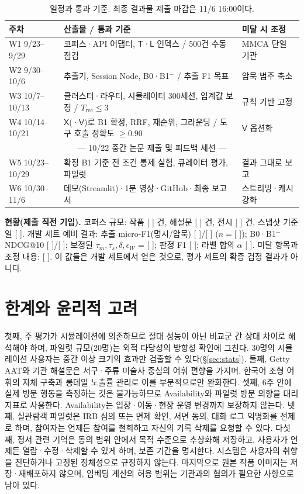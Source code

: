 \documentclass[10pt,twocolumn,letterpaper]{article}
\newcommand{\fillin}[1]{\textcolor{fillc}{[#1]}}
\newcommand{\sT}{\mathsf{T}}
\newcommand{\sX}{\mathsf{X}}
\newcommand{\sV}{\mathsf{V}}
\newcommand{\sL}{\mathsf{L}}
\begin{document}
\begin{table}[t]
\centering\small
\setlength{\tabcolsep}{3pt}
\begin{tabularx}{\columnwidth}{@{}l>{\raggedright\arraybackslash}X>{\raggedright\arraybackslash}p{1.65cm}@{}}
\toprule
주차 & 산출물 / 통과 기준 & 미달 시 조정 \\
\midrule
W1 9/23–9/29 & 코퍼스·API 어댑터, $\sT$·$\sL$ 인덱스 / 500건 수동 점검 & MMCA 단일 기관 \\
W2 9/30–10/6 & 추출기, Session Node, B0·B1$^-$ / 추출 F1 목표 & 암묵 범주 축소 \\
W3 10/7–10/13 & 클러스터·라우터, 시뮬레이터 300세션, 임계값 보정 / $T_{\mathrm{rec}}\le3$ & 규칙 기반 고정 \\
W4 10/14–10/21 & $\sX$(·$\sV$)로 B1 확정, RRF, 재순위, 그라운딩 / 도구 호출 정확도 $\ge0.90$ & $\sV$ 옵션화 \\
\multicolumn{3}{c}{\footnotesize — 10/22 중간 논문 제출 및 피드백 세션 —}\\
W5 10/23–10/29 & 확정 B1 기준 전 조건 통제 실험, 큐레이터 평가, 파일럿 & 결과 그대로 보고 \\
W6 10/30–11/6 & 데모(Streamlit)·1분 영상·GitHub·최종 보고서 & 스트리밍·캐시 강화 \\
\bottomrule
\end{tabularx}
\caption{일정과 통과 기준. 최종 결과물 제출 마감은 11/6 16:00이다.}
\label{tab:schedule}
\end{table}

\textbf{현황(제출 직전 기입).} 코퍼스 규모: 작품 \fillin{ } 건, 해설문 \fillin{ } 건, 전시 \fillin{ } 건, 스냅샷 기준일 \fillin{ }. 개발 세트 예비 결과: 추출 micro-F1(명시/암묵) \fillin{ }/\fillin{ } ($n=$\fillin{ }); B0·B1$^-$ NDCG@10 \fillin{ }/\fillin{ }; 보정된 $\tau_m,\tau_s,\delta,\epsilon_W$ = \fillin{ }; 판정 F1 \fillin{ }; 라벨 합의 $\alpha$ \fillin{ }. 미달 항목과 조정 내용: \fillin{ }. 이 값들은 개발 세트에서 얻은 것으로, 평가 세트의 확증 검정 결과가 아니다.

\section{한계와 윤리적 고려}
첫째, 주 평가가 시뮬레이션에 의존하므로 절대 성능이 아닌 비교군 간 상대 차이로 해석해야 하며, 파일럿 규모(20명)는 외적 타당성의 방향성 확인에 그친다. 30명의 시뮬레이션 사용자는 중간 이상 크기의 효과만 검출할 수 있다(§\ref{sec:stats}). 둘째, Getty AAT와 기관 해설문은 서구·주류 미술사 중심의 어휘 편향을 가지며, 한국어 조형 어휘의 자체 구축과 롱테일 노출률 관리로 이를 부분적으로만 완화한다. 셋째, 6주 안에 실제 방문 행동을 측정하는 것은 불가능하므로 Availability와 파일럿 방문 의향을 대리 지표로 사용한다. Availability는 입장·이동·현장 운영 변경까지 보장하지 않는다. 넷째, 실관람객 파일럿은 IRB 심의 또는 면제 확인, 서면 동의, 대화 로그 익명화를 전제로 하며, 참여자는 언제든 참여를 철회하고 자신의 기록 삭제를 요청할 수 있다. 다섯째, 정서 관련 기억은 동의 범위 안에서 목적 수준으로 추상화해 저장하고, 사용자가 언제든 열람·수정·삭제할 수 있게 하며, 보존 기간을 명시한다. 시스템은 사용자의 취향을 진단하거나 고정된 정체성으로 규정하지 않는다. 마지막으로 원본 작품 이미지는 저장·재배포하지 않으며, 임베딩 계산의 허용 범위는 기관과의 협의가 필요한 사항으로 남아 있다.
\end{document}
